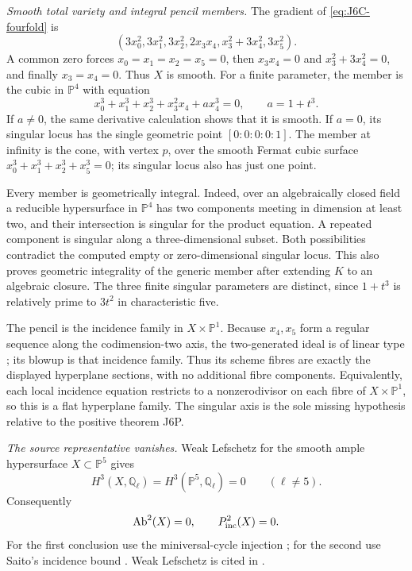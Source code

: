 \emph{Smooth total variety and integral pencil members.}
The gradient of \eqref{eq:J6C-fourfold} is
\[
 (3x_0^2,3x_1^2,3x_2^2,2x_3x_4,
   x_3^2+3x_4^2,3x_5^2).
\]
A common zero forces $x_0=x_1=x_2=x_5=0$, then
$x_3x_4=0$ and $x_3^2+3x_4^2=0$, and finally
$x_3=x_4=0$. Thus $X$ is smooth. For a finite parameter,
the member is the cubic in $\mathbb P^4$ with equation
\begin{equation}\label{eq:J6C-member}
 x_0^3+x_1^3+x_2^3+x_3^2x_4+a x_4^3=0,
 \qquad a=1+t^3.
\end{equation}
If $a\ne0$, the same derivative calculation shows that it
is smooth. If $a=0$, its singular locus has the single
geometric point $[0:0:0:0:1]$. The member at infinity is
the cone, with vertex $p$, over the smooth Fermat cubic
surface $x_0^3+x_1^3+x_2^3+x_5^3=0$; its singular locus
also has just one point.

Every member is geometrically integral. Indeed, over an
algebraically closed field a reducible hypersurface in
$\mathbb P^4$ has two components meeting in dimension at
least two, and their intersection is singular for the
product equation. A repeated component is singular along
a three-dimensional subset. Both possibilities contradict
the computed empty or zero-dimensional singular locus.
This also proves geometric integrality of the generic
member after extending $K$ to an algebraic closure. The
three finite singular parameters are distinct, since
$1+t^3$ is relatively prime to $3t^2$ in characteristic five.

The pencil is the incidence family in $X\times\mathbb P^1$.
Because $x_4,x_5$ form a regular sequence along the
codimension-two axis, the two-generated ideal is of linear
type \cite[Proposition IV-25, pp.~172--173]{DGJ_EisenbudHarris2000};
its blowup is that incidence family. Thus its scheme
fibres are exactly the displayed hyperplane sections,
with no additional fibre components. Equivalently, each
local incidence equation restricts to a nonzerodivisor on
each fibre of $X\times\mathbb P^1$, so this is a flat
hyperplane family. The singular axis is the sole missing
hypothesis relative to the positive theorem J6P.

\emph{The source representative vanishes.}
Weak Lefschetz for the smooth ample hypersurface
$X\subset\mathbb P^5$ gives
\[
 H^3(X,\mathbb Q_\ell)=H^3(\mathbb P^5,\mathbb Q_\ell)=0
 \qquad(\ell\ne5).
\]
Consequently
\begin{equation}\label{eq:J6C-zero-source}
 \operatorname{Ab}^2(X)=0,\qquad P^2_{\rm inc}(X)=0.
\end{equation}
For the first conclusion use the miniversal-cycle injection
\cite[Proposition 8.2, p.~31]{DGJ_ACMVFunctor}; for the
second use Saito's incidence bound
\cite[Proposition 3.4, pp.~109--110]{DGJ_Saito1979}.
Weak Lefschetz is cited in
\cite[(4.1.6), pp.~218--219]{DGJ_Deligne1980}.

